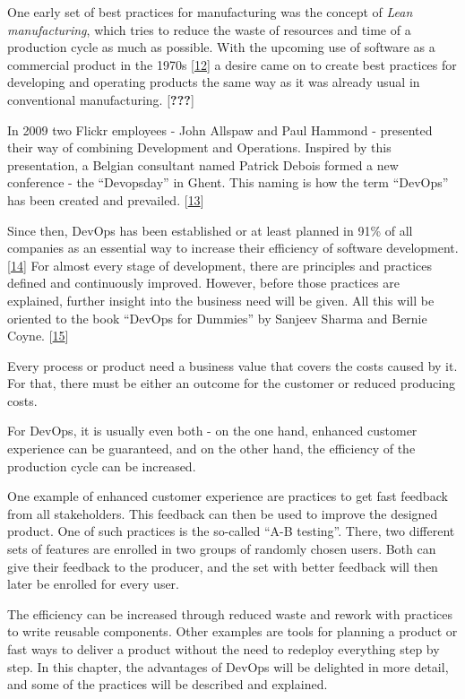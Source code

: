 \documentclass[12pt,english,a4paper,oneside,,tablecaptionabove]{scrbook}
\begin{document}
One early set of best practices for manufacturing was the concept of
\emph{Lean manufacturing}, which tries to reduce the waste of resources
and time of a production cycle as much as possible. With the upcoming
use of software as a commercial product in the 1970s
{[}\protect\hyperlink{ref-Pugh:2002:OSB:513126.513131}{12}{]} a desire
came on to create best practices for developing and operating products
the same way as it was already usual in conventional manufacturing.
{[}{\textbf{???}}{]}

In 2009 two Flickr employees - John Allspaw and Paul Hammond - presented
their way of combining Development and Operations. Inspired by this
presentation, a Belgian consultant named Patrick Debois formed a new
conference - the \enquote{Devopsday} in Ghent. This naming is how the
term \enquote{DevOps} has been created and prevailed.
{[}\protect\hyperlink{ref-SteveMezak}{13}{]}

Since then, DevOps has been established or at least planned in 91\% of
all companies as an essential way to increase their efficiency of
software development. {[}\protect\hyperlink{ref-SauceLabs}{14}{]} For
almost every stage of development, there are principles and practices
defined and continuously improved. However, before those practices are
explained, further insight into the business need will be given. All
this will be oriented to the book \enquote{DevOps for Dummies} by
Sanjeev Sharma and Bernie Coyne.
{[}\protect\hyperlink{ref-Sharma2017}{15}{]}

Every process or product need a business value that covers the costs
caused by it. For that, there must be either an outcome for the customer
or reduced producing costs.

For DevOps, it is usually even both - on the one hand, enhanced customer
experience can be guaranteed, and on the other hand, the efficiency of
the production cycle can be increased.

One example of enhanced customer experience are practices to get fast
feedback from all stakeholders. This feedback can then be used to
improve the designed product. One of such practices is the so-called
\enquote{A-B testing}. There, two different sets of features are
enrolled in two groups of randomly chosen users. Both can give their
feedback to the producer, and the set with better feedback will then
later be enrolled for every user.

The efficiency can be increased through reduced waste and rework with
practices to write reusable components. Other examples are tools for
planning a product or fast ways to deliver a product without the need to
redeploy everything step by step. In this chapter, the advantages of
DevOps will be delighted in more detail, and some of the practices will
be described and explained.
\end{document}
